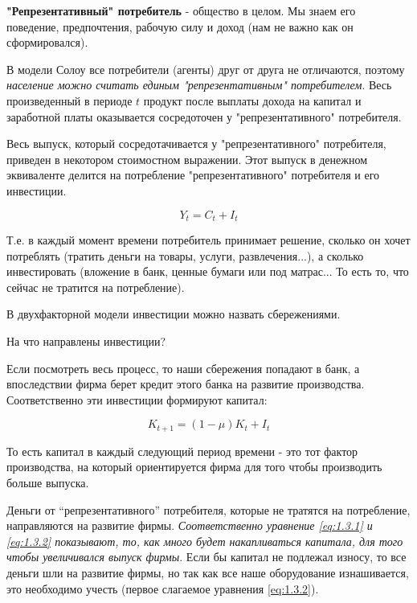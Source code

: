\documentclass[reqno]{article}
\theoremstyle{definition}
\theoremstyle{definition}
\theoremstyle{definition}
\theoremstyle{definition}
\theoremstyle{definition}
\theoremstyle{definition}
\theoremstyle{definition}
\theoremstyle{definition}
\theoremstyle{definition}
\begin{document}
		\textbf{"Репрезентативный" потребитель} - общество в целом. Мы знаем его поведение, предпочтения, рабочую силу и доход (нам не важно как он сформировался).
		
		В модели Солоу все потребители (агенты) друг от друга не отличаются, поэтому \emph{население можно считать единым "репрезентативным" потребителем}. Весь произведенный в периоде $t$ продукт после выплаты дохода на капитал и заработной платы оказывается сосредоточен у "репрезентативного" потребителя.
		
		Весь выпуск, который сосредотачивается у "репрезентативного" потребителя, приведен в некотором стоимостном выражении. Этот выпуск в денежном эквиваленте делится на потребление "репрезентативного" потребителя и его инвестиции.
		
		\begin{equation}\label{eq:1.3.1}
			Y_t = C_t + I_t
		\end{equation}
		
		Т.е. в каждый момент времени потребитель принимает решение, сколько он хочет потреблять (тратить деньги на товары, услуги, развлечения...), а сколько инвестировать (вложение в банк, ценные бумаги или под матрас... То есть то, что сейчас не тратится на потребление).
		
		В двухфакторной модели инвестиции можно назвать сбережениями.\bigskip
		
		На что направлены инвестиции? 
		
		Если посмотреть весь процесс, то наши сбережения попадают в банк, а впоследствии фирма берет кредит этого банка на развитие производства. Соответственно эти инвестиции формируют капитал:
		
		\begin{equation}\label{eq:1.3.2}
			K_{t+1} = (1 - \mu) K_t + I_t
		\end{equation}
		
		То есть капитал в каждый следующий период времени - это тот фактор производства, на который ориентируется фирма для того чтобы производить больше выпуска.
		
		Деньги от ``репрезентативного'' потребителя, которые не тратятся на потребление, направляются на развитие фирмы.  \emph{Соответственно уравнение \ref{eq:1.3.1} и \ref{eq:1.3.2} показывают, то, как много будет накапливаться капитала, для того чтобы увеличивался выпуск фирмы}. Если бы капитал не подлежал износу, то все деньги шли на развитие фирмы, но так как все наше оборудование изнашивается, это необходимо учесть (первое слагаемое уравнения \ref{eq:1.3.2}).
		
\end{document}
